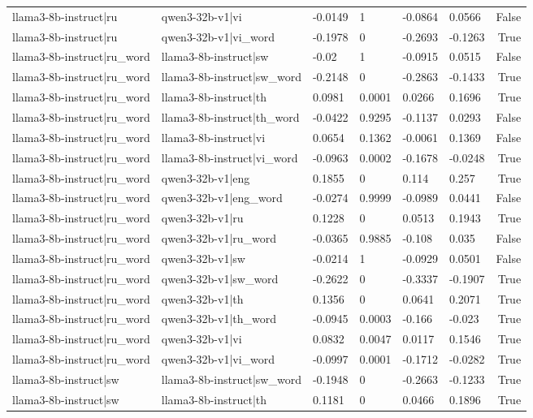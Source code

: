 \begin{table}
\begin{tabular}{llllllr}
llama3-8b-instruct|ru & qwen3-32b-v1|vi & -0.0149 & 1 & -0.0864 & 0.0566 & False \\
llama3-8b-instruct|ru & qwen3-32b-v1|vi_word & -0.1978 & 0 & -0.2693 & -0.1263 & True \\
llama3-8b-instruct|ru_word & llama3-8b-instruct|sw & -0.02 & 1 & -0.0915 & 0.0515 & False \\
llama3-8b-instruct|ru_word & llama3-8b-instruct|sw_word & -0.2148 & 0 & -0.2863 & -0.1433 & True \\
llama3-8b-instruct|ru_word & llama3-8b-instruct|th & 0.0981 & 0.0001 & 0.0266 & 0.1696 & True \\
llama3-8b-instruct|ru_word & llama3-8b-instruct|th_word & -0.0422 & 0.9295 & -0.1137 & 0.0293 & False \\
llama3-8b-instruct|ru_word & llama3-8b-instruct|vi & 0.0654 & 0.1362 & -0.0061 & 0.1369 & False \\
llama3-8b-instruct|ru_word & llama3-8b-instruct|vi_word & -0.0963 & 0.0002 & -0.1678 & -0.0248 & True \\
llama3-8b-instruct|ru_word & qwen3-32b-v1|eng & 0.1855 & 0 & 0.114 & 0.257 & True \\
llama3-8b-instruct|ru_word & qwen3-32b-v1|eng_word & -0.0274 & 0.9999 & -0.0989 & 0.0441 & False \\
llama3-8b-instruct|ru_word & qwen3-32b-v1|ru & 0.1228 & 0 & 0.0513 & 0.1943 & True \\
llama3-8b-instruct|ru_word & qwen3-32b-v1|ru_word & -0.0365 & 0.9885 & -0.108 & 0.035 & False \\
llama3-8b-instruct|ru_word & qwen3-32b-v1|sw & -0.0214 & 1 & -0.0929 & 0.0501 & False \\
llama3-8b-instruct|ru_word & qwen3-32b-v1|sw_word & -0.2622 & 0 & -0.3337 & -0.1907 & True \\
llama3-8b-instruct|ru_word & qwen3-32b-v1|th & 0.1356 & 0 & 0.0641 & 0.2071 & True \\
llama3-8b-instruct|ru_word & qwen3-32b-v1|th_word & -0.0945 & 0.0003 & -0.166 & -0.023 & True \\
llama3-8b-instruct|ru_word & qwen3-32b-v1|vi & 0.0832 & 0.0047 & 0.0117 & 0.1546 & True \\
llama3-8b-instruct|ru_word & qwen3-32b-v1|vi_word & -0.0997 & 0.0001 & -0.1712 & -0.0282 & True \\
llama3-8b-instruct|sw & llama3-8b-instruct|sw_word & -0.1948 & 0 & -0.2663 & -0.1233 & True \\
llama3-8b-instruct|sw & llama3-8b-instruct|th & 0.1181 & 0 & 0.0466 & 0.1896 & True \\

\end{tabular}
\end{table}
